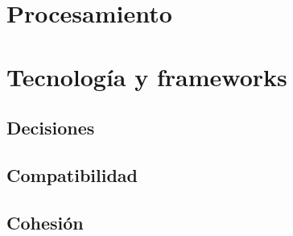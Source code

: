 \section{Procesamiento}

\section{Tecnología y frameworks}

\subsection{Decisiones}

\subsection{Compatibilidad}

\subsection{Cohesión}


